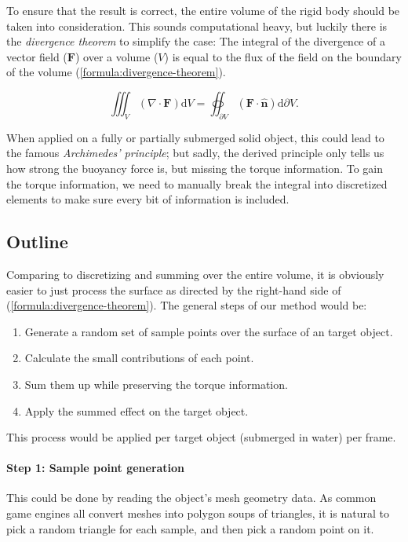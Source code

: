 To ensure that the result is correct, the entire volume of the rigid body should be taken into consideration.
This sounds computational heavy, but luckily there is the \emph{divergence theorem} to simplify the case:
The integral of the divergence of a vector field ($\mathbf{F}$) over a volume ($V$) is equal to the flux of the field on the boundary of the volume (\ref{formula:divergence-theorem}).

\begin{equation}
	\iiint_{V}(\nabla\cdot\mathbf{F})\mathrm{d}V
	=
	\oiint_{\partial V}\left(\mathbf{F}\cdot\hat{\mathbf{n}}\right)\mathrm{d}\partial V
	.
	\label{formula:divergence-theorem}
\end{equation}

When applied on a fully or partially submerged solid object, this could lead to the famous \emph{Archimedes' principle};
but sadly, the derived principle only tells us how strong the buoyancy force is, but missing the torque information.
To gain the torque information, we need to manually break the integral into discretized elements to make sure every bit of information is included.

\subsection{Outline}

Comparing to discretizing and summing over the entire volume, it is obviously easier to just process the surface as directed by the right-hand side of (\ref{formula:divergence-theorem}).
The general steps of our method would be:
\begin{enumerate}
	\item Generate a random set of sample points over the surface of an target object.
	\item Calculate the small contributions of each point.
	\item Sum them up while preserving the torque information.
	\item Apply the summed effect on the target object.
\end{enumerate}
This process would be applied per target object (submerged in water) per frame.

\paragraph*{Step 1: Sample point generation}

This could be done by reading the object's mesh geometry data.
As common game engines all convert meshes into polygon soups of triangles, it is natural to pick a random triangle for each sample, and then pick a random point on it.

